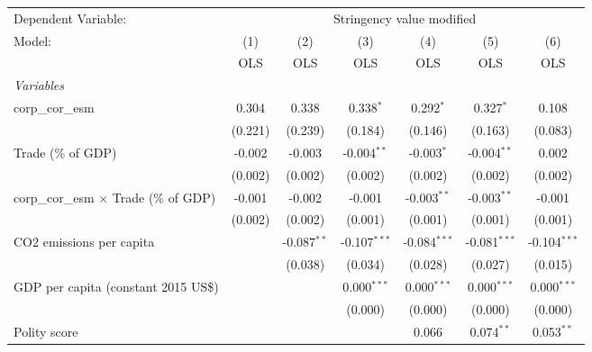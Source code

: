 
\begingroup
\centering
\begin{tabular}{lcccccc}
   \toprule
   Dependent Variable: & \multicolumn{6}{c}{Stringency value modified}\\
   Model:                                        & (1)     & (2)           & (3)            & (4)            & (5)            & (6)\\  
                                                 &  OLS    & OLS           & OLS            & OLS            & OLS            & OLS\\  
   \midrule
   \emph{Variables}\\
   corp\_cor\_esm                                & 0.304   & 0.338         & 0.338$^{*}$    & 0.292$^{*}$    & 0.327$^{*}$    & 0.108\\   
                                                 & (0.221) & (0.239)       & (0.184)        & (0.146)        & (0.163)        & (0.083)\\   
   Trade (\% of GDP)                             & -0.002  & -0.003        & -0.004$^{**}$  & -0.003$^{*}$   & -0.004$^{**}$  & 0.002\\   
                                                 & (0.002) & (0.002)       & (0.002)        & (0.002)        & (0.002)        & (0.002)\\   
   corp\_cor\_esm $\times$ Trade (\% of GDP)     & -0.001  & -0.002        & -0.001         & -0.003$^{**}$  & -0.003$^{**}$  & -0.001\\   
                                                 & (0.002) & (0.002)       & (0.001)        & (0.001)        & (0.001)        & (0.001)\\   
   CO2 emissions per capita                      &         & -0.087$^{**}$ & -0.107$^{***}$ & -0.084$^{***}$ & -0.081$^{***}$ & -0.104$^{***}$\\   
                                                 &         & (0.038)       & (0.034)        & (0.028)        & (0.027)        & (0.015)\\   
   GDP per capita (constant 2015 US\$)           &         &               & 0.000$^{***}$  & 0.000$^{***}$  & 0.000$^{***}$  & 0.000$^{***}$\\   
                                                 &         &               & (0.000)        & (0.000)        & (0.000)        & (0.000)\\   
   Polity score                                  &         &               &                & 0.066          & 0.074$^{**}$   & 0.053$^{**}$\\   

\end{tabular}
